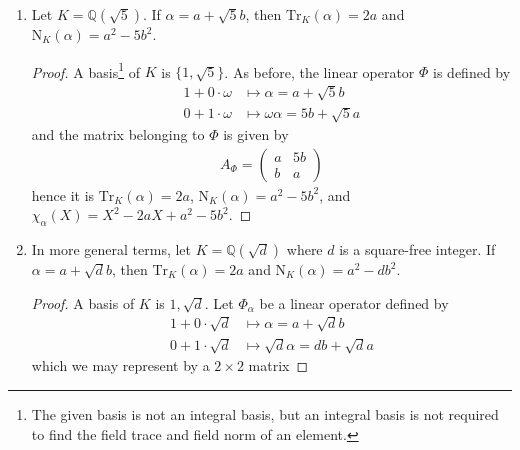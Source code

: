 \begin{example}
\begin{enumerate}
\begin{proof}
\begin{align*}
\begin{pmatrix}
                a & 2b \\
                b & a
            \end{pmatrix} \text{.}
        \end{align*}
        So we have \(\mathrm{Tr}_K(\alpha) = 2a\), \(\mathrm{N}_K(\alpha) = a^2 - 2b^2\), and \(\chi_\alpha = X^2 - 2a X + a^2 - 2b^2\).
    \end{proof}
    \item Let \(K = \mathbb{Q}(\sqrt{5})\). If \(\alpha = a + \sqrt{5}b\), then \(\mathrm{Tr}_K(\alpha) = 2a\) and \(\mathrm{N}_K(\alpha) = a^2 - 5b^2\).
    \begin{proof}
        A basis\footnote{ The given basis is not an integral basis, but an integral basis is not required to find the field trace and field norm of an element.} of \(K\) is \(\{1, \sqrt{5}\}\). As before, the linear operator \(\Phi\) is defined by
        \begin{align*}
            1 + 0 \cdot \omega &\mapsto \alpha = a + \sqrt{5} b \\
            0 + 1 \cdot \omega &\mapsto \omega \alpha = 5b + \sqrt{5}a
        \end{align*}
        and the matrix belonging to \(\Phi\) is given by
        \begin{align*}
            A_\Phi = \begin{pmatrix}
                a & 5b \\
                b & a
            \end{pmatrix}
        \end{align*}
        hence it is \(\mathrm{Tr}_K(\alpha) = 2a\), \(\mathrm{N}_K(\alpha) = a^2 - 5b^2\), and \(\chi_\alpha(X) = X^2 - 2aX + a^2 - 5b^2\).
    \end{proof}
    \item In more general terms, let \(K = \mathbb{Q}(\sqrt{d})\) where \(d\) is a square-free integer. If \(\alpha = a + \sqrt{d}b\), then \(\mathrm{Tr}_K(\alpha) = 2a\) and \(\mathrm{N}_K(\alpha) = a^2 - db^2\).
    \begin{proof}
        A basis of \(K\) is \({1, \sqrt{d}}\). Let \(\Phi_\alpha\) be a linear operator defined by
        \begin{align*}
            1 + 0 \cdot \sqrt{d} &\mapsto \alpha = a + \sqrt{d}b \\
            0 + 1 \cdot \sqrt{d} &\mapsto \sqrt{d}\alpha = db + \sqrt{d}a
        \end{align*}
        which we may represent by a \(2 \times 2\) matrix

\end{proof}
\end{enumerate}
\end{example}
